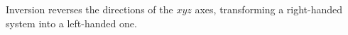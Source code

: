 Inversion reverses the directions of the $xyz$ axes, transforming a right-handed system into a left-handed one.

